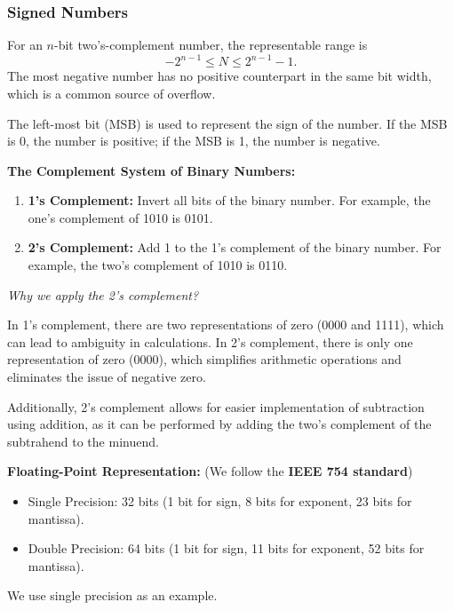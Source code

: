 \documentclass[11pt,a4paper]{article}
\providecommand{\tightlist}{\setlength{\itemsep}{1pt}\setlength{\parskip}{0pt}}
\begin{document}
\subsubsection{Signed Numbers}\label{signed-numbers}

For an \(n\)-bit two's-complement number, the representable range is \[
-2^{n-1} \leq N \leq 2^{n-1}-1 .
\] The most negative number has no positive counterpart in the same bit
width, which is a common source of overflow.

The left-most bit (MSB) is used to represent the sign of the number. If
the MSB is 0, the number is positive; if the MSB is 1, the number is
negative.

\textbf{The Complement System of Binary Numbers:}\\

\begin{enumerate}
\def\labelenumi{\arabic{enumi}.}
\tightlist
\item
  \textbf{1's Complement:} Invert all bits of the binary number. For
  example, the one's complement of 1010 is 0101.
\item
  \textbf{2's Complement:} Add 1 to the 1's complement of the binary
  number. For example, the two's complement of 1010 is 0110.
\end{enumerate}

\emph{Why we apply the 2's complement?}

In 1's complement, there are two representations of zero (0000 and
1111), which can lead to ambiguity in calculations. In 2's complement,
there is only one representation of zero (0000), which simplifies
arithmetic operations and eliminates the issue of negative zero.

Additionally, 2's complement allows for easier implementation of
subtraction using addition, as it can be performed by adding the two's
complement of the subtrahend to the minuend.

\textbf{Floating-Point Representation:} (We follow the \textbf{IEEE 754
standard})

\begin{itemize}
\tightlist
\item
  Single Precision: 32 bits (1 bit for sign, 8 bits for exponent, 23
  bits for mantissa).
\item
  Double Precision: 64 bits (1 bit for sign, 11 bits for exponent, 52
  bits for mantissa).
\end{itemize}

We use single precision as an example.
\end{document}
